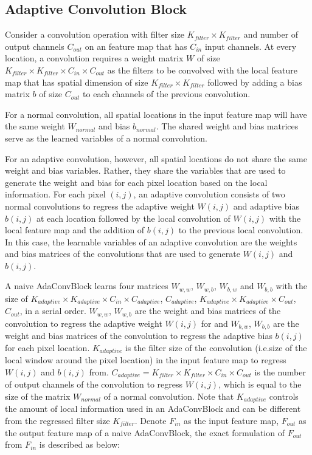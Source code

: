\documentclass{article} %
\begin{document}
\subsection{Adaptive Convolution Block}
\label{adaconvblock_details}
Consider a convolution operation with filter size $K_{filter} \times K_{filter}$ and number of output channels $C_{out}$ on an feature map that has $C_{in}$ input channels. At every location, a convolution requires a weight matrix $W$ of size $K_{filter} \times K_{filter} \times C_{in} \times C_{out}$ as the filters to be convolved with the local feature map that has spatial dimension of size $K_{filter} \times K_{filter}$ followed by adding a bias matrix $b$ of size $C_{out}$ to each channels of the previous convolution. \par
For a normal convolution, all spatial locations in the input feature map will have the same weight $W_{normal}$ and bias $b_{normal}$. The shared weight and bias matrices serve as the learned variables of a normal convolution. \par
For an adaptive convolution, however, all spatial locations do not share the same weight and bias variables. Rather, they share the variables that are used to generate the weight and bias for each pixel location based on the local information. For each pixel $(i, j)$, an adaptive convolution consists of two normal convolutions to regress the adaptive weight $W(i,j)$ and adaptive bias $b(i,j)$ at each location followed by the local convolution of $W(i,j)$ with the local feature map and the addition of $b(i,j)$ to the previous local convolution. In this case, the learnable variables of an adaptive convolution are the weights and bias matrices of the convolutions that are used to generate $W(i,j)$ and $b(i,j)$. \par
A naive AdaConvBlock learns four matrices $W_{w,w}$, $W_{w,b}$, $W_{b,w}$ and $W_{b,b}$ with the size of $K_{adaptive} \times K_{adaptive} \times C_{in} \times C_{adaptive}$, $C_{adaptive}$, $K_{adaptive} \times K_{adaptive} \times C_{out}$, $C_{out}$, in a serial order. $W_{w,w}$,  $W_{w,b}$ are the weight and bias matrices of the convolution to regress the adaptive weight $W(i,j)$ for and $W_{b,w}$, $W_{b,b}$ are the weight and bias matrices of the convolution to regress the adaptive bias $b(i,j)$ for each pixel location. $K_{adaptive}$ is the filter size of the convolution (i.e.\the size of the local window around the pixel location) in the input feature map to regress $W(i,j)$ and $b(i,j)$ from. $C_{adaptive} = K_{filter} \times K_{filter} \times C_{in} \times C_{out}$ is the number of output channels of the convolution to regress $W(i,j)$, which is equal to the size of the matrix $W_{normal}$ of a normal convolution. Note that $K_{adaptive}$ controls the amount of local information used in an AdaConvBlock and can be different from the regressed filter size $K_{filter}$. Denote $F_{in}$ as the input feature map, $F_{out}$ as the output feature map of a naive AdaConvBlock, the exact formulation of $F_{out}$ from $F_{in}$ is described as below: 
\end{document}
